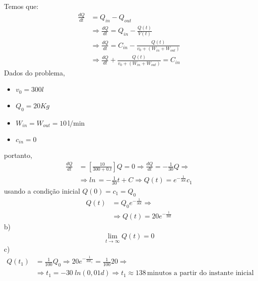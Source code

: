 \documentclass[a4paper,12pt,reqno,natbib]{amsart}
\theoremstyle{definition}
\begin{document}
Temos que:
\begin{align*}
	\frac{dQ}{dt} &= Q_{in} - Q_{out} \\
	&\Rightarrow \frac{dQ}{dt} = Q_{in} - \frac{Q(t)}{V(t)} \\
	&\Rightarrow \frac{dQ}{dt} = C_{in} - \frac{Q(t)}{v_0 + (W_{in} + W_{out})} \\
	&\Rightarrow \boxed{\frac{dQ}{dt} + \frac{Q(t)}{v_0 + (W_{in} + W_{out})}  = C_{in}} 
\end{align*}
Dados do problema,
\begin{itemize}
	\item $v_0 = 300 l$ 
	\item $Q_0 = 20 Kg$ 
	\item $W_{in} = W_{out} = 10 \hspace{2pt}\mbox{l/min}$ 
	\item $c_{in} = 0$
\end{itemize}
portanto,
\begin{align*}
	\frac{dQ}{dt} &=\left [ \frac{10}{300 + 0.t}\right ]Q  = 0 \Rightarrow \frac{dQ}{dt} = - \frac{1}{30}Q \Rightarrow \\
	& \Rightarrow ln \hspace{2pt} = - \frac{1}{30}t + C \Rightarrow Q(t) = e^{-\frac{1}{30t}}c_1
\end{align*}
usando a condi\c c\~ao inicial $Q(0) = c_1 = Q_0$
\begin{align*}
	Q(t) &= Q_0 e^{-\frac{1}{30t}} \Rightarrow \\
	&\Rightarrow \boxed{Q(t) = 20 e^{-\frac{1}{30t}}} 
\end{align*}
b)\\
\begin{align*}
	\lim_{t\rightarrow \infty} Q(t) = 0
\end{align*}
c)\\
\begin{align*}
	Q(t_1) &= \frac{1}{100}Q_0 \Rightarrow 20e^{-\frac{1}{30t_1}} = \frac{1}{100}20 \Rightarrow \\
	&\Rightarrow t_1 = -30\hspace{3pt} ln(0,01d) \Rightarrow \boxed{t_1 \approx 138 \hspace{2pt} \mbox{minutos a partir
	do instante inicial}} 
\end{align*}

\vspace{0.6 cm}
\end{document}
